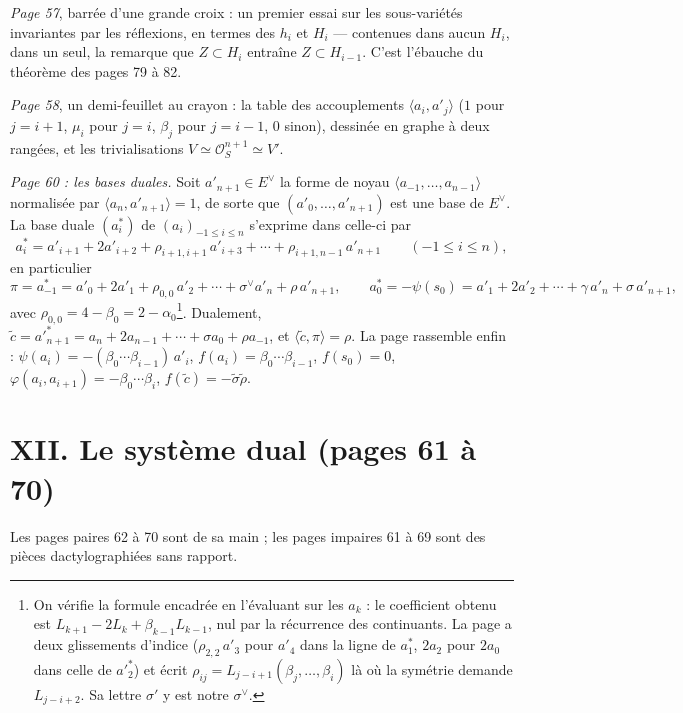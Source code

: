 \documentclass[11pt,a4paper]{article}
\begin{document}
\emph{Page 57}, barrée d'une grande croix : un premier essai sur les
sous-variétés invariantes par les réflexions, en termes des $h_i$ et $H_i$ ---
contenues dans aucun $H_i$, dans un seul, la remarque que $Z \subset H_i$
entraîne $Z \subset H_{i-1}$. C'est l'ébauche du théorème des pages 79 à 82.

\emph{Page 58}, un demi-feuillet au crayon : la table des accouplements
$\langle a_i, a'_j \rangle$ ($1$ pour $j = i+1$, $\mu_i$ pour $j = i$, $\beta_j$
pour $j = i-1$, $0$ sinon), dessinée en graphe à deux rangées, et les
trivialisations $V \simeq \mathcal{O}_S^{n+1} \simeq V'$.

\emph{Page 60 : les bases duales.} Soit $a'_{n+1} \in E^\vee$ la forme de noyau
$\langle a_{-1}, \ldots, a_{n-1} \rangle$ normalisée par $\langle a_n,
a'_{n+1} \rangle = 1$, de sorte que $(a'_0, \ldots, a'_{n+1})$ est une base de
$E^\vee$. La base duale $(a^*_i)$ de $(a_i)_{-1 \leqslant i \leqslant n}$
s'exprime dans celle-ci par
\[
a^*_i = a'_{i+1} + 2a'_{i+2} + \rho_{i+1,i+1}\, a'_{i+3} + \cdots +
\rho_{i+1,n-1}\, a'_{n+1} \qquad (-1 \leqslant i \leqslant n),
\]
en particulier
\[
\pi = a^*_{-1} = a'_0 + 2a'_1 + \rho_{0,0}\, a'_2 + \cdots + \sigma^\vee a'_n +
\rho\, a'_{n+1}, \qquad
a^*_0 = -\psi(s_0) = a'_1 + 2a'_2 + \cdots + \gamma\, a'_n + \sigma\, a'_{n+1},
\]
avec $\rho_{0,0} = 4 - \beta_0 = 2 - \alpha_0$\footnote{On vérifie la formule
encadrée en l'évaluant sur les $a_k$ : le coefficient obtenu est $L_{k+1} -
2L_k + \beta_{k-1}L_{k-1}$, nul par la récurrence des continuants. La page a
deux glissements d'indice ($\rho_{2,2}\, a'_3$ pour $a'_4$ dans la ligne de
$a^*_1$, $2a_2$ pour $2a_0$ dans celle de $a'^*_2$) et écrit $\rho_{ij} =
L_{j-i+1}(\beta_j, \ldots, \beta_i)$ là où la symétrie demande $L_{j-i+2}$. Sa
lettre $\sigma'$ y est notre $\sigma^\vee$.}. Dualement, $\tilde c = a'^*_{n+1}
= a_n + 2a_{n-1} + \cdots + \sigma a_0 + \rho a_{-1}$, et $\langle \tilde c, \pi
\rangle = \rho$. La page rassemble enfin : $\psi(a_i) = -(\beta_0 \cdots
\beta_{i-1})\, a'_i$, $f(a_i) = \beta_0 \cdots \beta_{i-1}$, $f(s_0) = 0$,
$\varphi(a_i, a_{i+1}) = -\beta_0 \cdots \beta_i$, $f(\tilde c) =
-\tilde\sigma\tilde\rho$.

\section*{XII. Le système dual (pages 61 à 70)}

Les pages paires 62 à 70 sont de sa main ; les pages impaires 61 à 69 sont des
pièces dactylographiées sans rapport.
\end{document}
